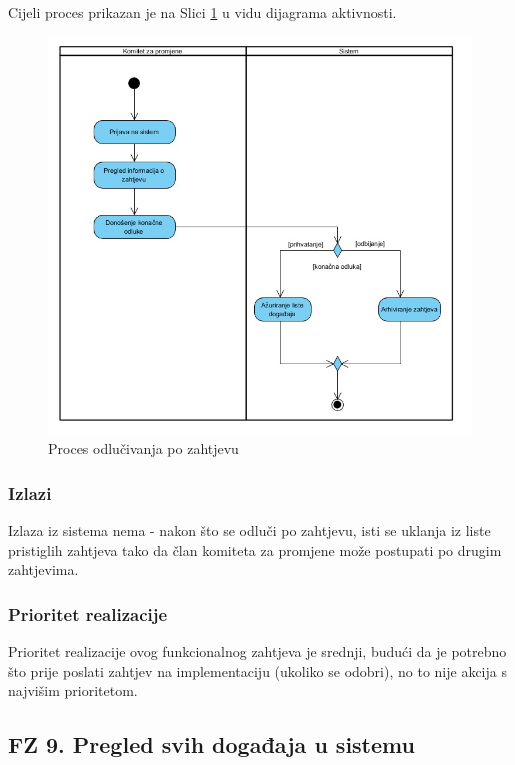 \documentclass[12pt,a4paper]{article}
\begin{document}
Cijeli proces prikazan je na Slici \ref{act8} u vidu dijagrama aktivnosti.

\begin{figure}[H]
\center
\includegraphics[scale=0.5]{../res/Activity/activity8.JPG}
\caption{Proces odlučivanja po zahtjevu}
\label{act8}
\end{figure}

\subsubsection{Izlazi}

Izlaza iz sistema nema - nakon što se odluči po zahtjevu, isti se uklanja iz liste pristiglih zahtjeva tako da član komiteta za promjene može postupati po drugim zahtjevima.

\subsubsection{Prioritet realizacije}

Prioritet realizacije ovog funkcionalnog zahtjeva je srednji, budući da je potrebno što prije poslati zahtjev na implementaciju (ukoliko se odobri), no to nije akcija s najvišim prioritetom.

\subsection{FZ 9. Pregled svih događaja u sistemu}
\end{document}
